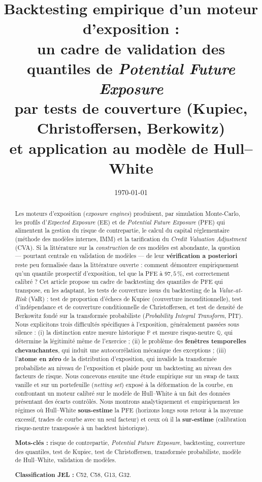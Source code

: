 \documentclass[11pt,a4paper]{article}
\title{\bfseries Backtesting empirique d'un moteur d'exposition :\\[2pt]
un cadre de validation des quantiles de \emph{Potential Future Exposure}\\
par tests de couverture (Kupiec, Christoffersen, Berkowitz)\\
et application au modèle de Hull--White}
\author{}
\date{\today}
\newcommand{\Prob}{\mathbb{P}}
\newcommand{\Qmeas}{\mathbb{Q}}
\theoremstyle{remark}
\begin{document}
\maketitle

\begin{abstract}
\noindent
Les moteurs d'exposition (\emph{exposure engines}) produisent, par simulation Monte-Carlo, les profils d'\emph{Expected Exposure} (EE) et de \emph{Potential Future Exposure} (PFE) qui alimentent la gestion du risque de contrepartie, le calcul du capital réglementaire (méthode des modèles internes, IMM) et la tarification du \emph{Credit Valuation Adjustment} (CVA). Si la littérature sur la \emph{construction} de ces modèles est abondante, la question --- pourtant centrale en validation de modèles --- de leur \textbf{vérification a posteriori} reste peu formalisée dans la littérature ouverte : comment démontrer empiriquement qu'un quantile prospectif d'exposition, tel que la PFE à $97{,}5\,\%$, est correctement calibré ? Cet article propose un cadre de backtesting des quantiles de PFE qui transpose, en les adaptant, les tests de couverture issus du backtesting de la \emph{Value-at-Risk} (VaR) : test de proportion d'échecs de Kupiec (couverture inconditionnelle), test d'indépendance et de couverture conditionnelle de Christoffersen, et test de densité de Berkowitz fondé sur la transformée probabiliste (\emph{Probability Integral Transform}, PIT). Nous explicitons trois difficultés spécifiques à l'exposition, généralement passées sous silence : (i) la distinction entre mesure historique $\Prob$ et mesure risque-neutre $\Qmeas$, qui détermine la légitimité même de l'exercice ; (ii) le problème des \textbf{fenêtres temporelles chevauchantes}, qui induit une autocorrélation mécanique des exceptions ; (iii) l'\textbf{atome en zéro} de la distribution d'exposition, qui invalide la transformée probabiliste au niveau de l'exposition et plaide pour un backtesting au niveau des facteurs de risque. Nous concevons ensuite une étude empirique sur un swap de taux vanille et sur un portefeuille (\emph{netting set}) exposé à la déformation de la courbe, en confrontant un moteur calibré sur le modèle de Hull--White à un fait des données présentant des écarts contrôlés. Nous montrons analytiquement et empiriquement les régimes où Hull--White \textbf{sous-estime} la PFE (horizons longs sous retour à la moyenne excessif, trades de courbe avec un seul facteur) et ceux où il la \textbf{sur-estime} (calibration risque-neutre transposée à un backtest historique).

\medskip
\noindent\textbf{Mots-clés :} risque de contrepartie, \emph{Potential Future Exposure}, backtesting, couverture des quantiles, test de Kupiec, test de Christoffersen, transformée probabiliste, modèle de Hull--White, validation de modèles.

\noindent\textbf{Classification JEL :} C52, C58, G13, G32.
\end{abstract}
\end{document}
